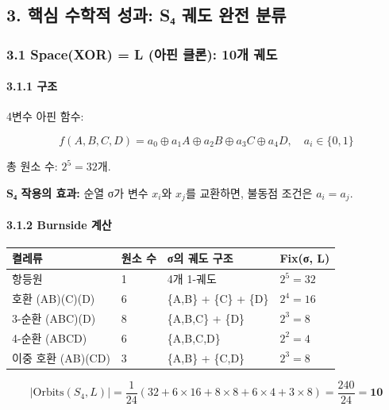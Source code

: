 \documentclass[
]{article}
\newcounter{none} %
\begin{document}
\subsection{3. 핵심 수학적 성과: S₄ 궤도 완전
분류}\label{uxd575uxc2ec-uxc218uxd559uxc801-uxc131uxacfc-sux2084-uxada4uxb3c4-uxc644uxc804-uxbd84uxb958}

\subsubsection{3.1 Space(XOR) = L (아핀 클론): 10개
궤도}\label{spacexor-l-uxc544uxd540-uxd074uxb860-10uxac1c-uxada4uxb3c4}

\paragraph{3.1.1 구조}\label{uxad6cuxc870}

4변수 아핀 함수:

\[f(A, B, C, D) = a_0 \oplus a_1 A \oplus a_2 B \oplus a_3 C \oplus a_4 D, \quad a_i \in \{0, 1\}\]

총 원소 수: \(2^5 = 32\)개.

\textbf{S₄ 작용의 효과:} 순열 σ가 변수 \(x_i\)와 \(x_j\)를 교환하면,
불동점 조건은 \(a_i = a_j\).

\paragraph{3.1.2 Burnside 계산}\label{burnside-uxacc4uxc0b0}

{\def\LTcaptype{none} %
\begin{longtable}[]{@{}llll@{}}
\toprule\noalign{}
켤레류 & 원소 수 & σ의 궤도 구조 & Fix(σ, L) \\
\midrule\noalign{}
\endhead
\bottomrule\noalign{}
\endlastfoot
항등원 & 1 & 4개 1-궤도 & \(2^5 = 32\) \\
호환 (AB)(C)(D) & 6 & \{A,B\} + \{C\} + \{D\} & \(2^4 = 16\) \\
3-순환 (ABC)(D) & 8 & \{A,B,C\} + \{D\} & \(2^3 = 8\) \\
4-순환 (ABCD) & 6 & \{A,B,C,D\} & \(2^2 = 4\) \\
이중 호환 (AB)(CD) & 3 & \{A,B\} + \{C,D\} & \(2^3 = 8\) \\
\end{longtable}
}

\[|\text{Orbits}(S_4, L)| = \frac{1}{24}(32 + 6 \times 16 + 8 \times 8 + 6 \times 4 + 3 \times 8) = \frac{240}{24} = \mathbf{10}\]
\end{document}
